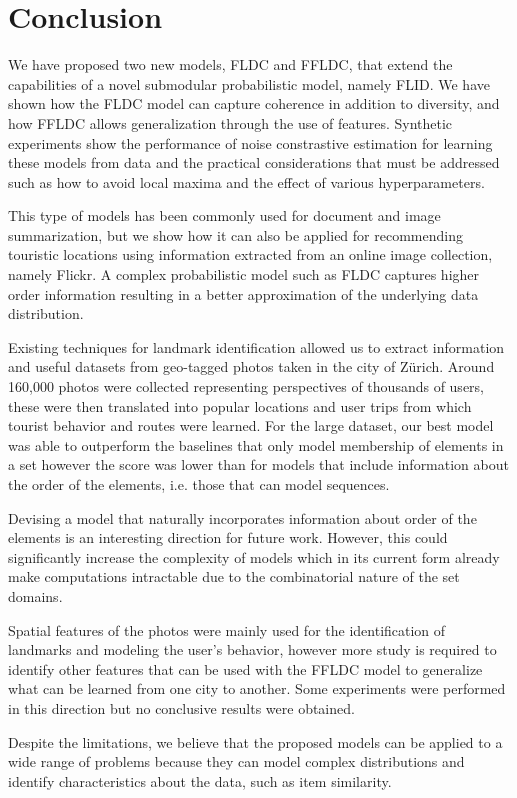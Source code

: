 \chapter{Conclusion}
\label{sec:conclusion}

We have proposed two new models, FLDC and FFLDC, that extend the capabilities of a novel submodular probabilistic model, namely FLID. We have shown how the FLDC model can capture coherence in addition to diversity, and how FFLDC allows generalization through the use of features. Synthetic experiments show the performance of noise constrastive estimation for learning these models from data and the practical considerations that must be addressed such as how to avoid local maxima and the effect of various hyperparameters.

This type of models has been commonly used for document and image summarization, but we show how it can also be applied for recommending touristic locations using information extracted from an online image collection, namely Flickr. A complex probabilistic model such as FLDC captures higher order information resulting in a better approximation of the underlying data distribution.

Existing techniques for landmark identification allowed us to extract information and useful datasets from geo-tagged photos taken in the city of Zürich. Around 160,000 photos were collected representing perspectives of thousands of users, these were then translated into popular locations and user trips from which tourist behavior and routes were learned. For the large dataset, our best model was able to outperform the baselines that only model membership of elements in a set however the score was lower than for models that include information about the order of the elements, i.e. those that can model sequences.

Devising a model that naturally incorporates information about order of the elements is an interesting direction for future work. However, this could significantly increase the complexity of models which in its current form already make computations intractable due to the combinatorial nature of the set domains.

Spatial features of the photos were mainly used for the identification of landmarks and modeling the user's behavior, however more study is required to identify other features that can be used with the FFLDC model to generalize what can be learned from one city to another. Some experiments were performed in this direction but no conclusive results were obtained.

Despite the limitations, we believe that the proposed models can be applied to a wide range of problems because they can model complex distributions and identify characteristics about the data, such as item similarity.